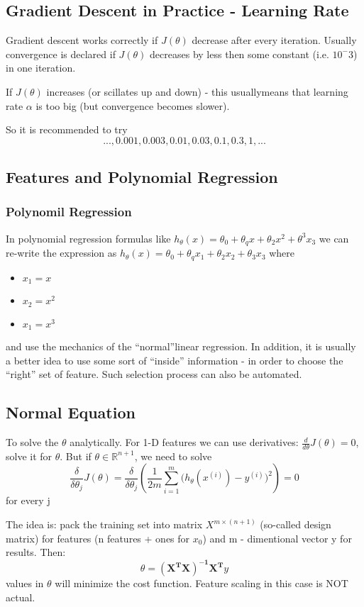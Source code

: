 \documentclass{scrartcl}
\begin{document}
\subsection {Gradient Descent in Practice - Learning Rate}
\label {4-4}
Gradient descent works correctly if $J(\theta)$ decrease after every
iteration. Usually convergence is declared if $J(\theta)$ decreases by
less then some constant (i.e. $10^-{3}$) in one iteration.

If  $J(\theta)$ increases (or scillates up and down) - this usuallymeans that learning rate
$\alpha$ is too big (but convergence becomes slower).

So it is recommended to try \[
..., 0.001,0.003, 0.01, 0.03, 0.1, 0.3, 1, ...
\]
 
\subsection{Features and Polynomial Regression}
\label{4-5}
\subsubsection{Polynomil Regression}
In polynomial regression formulas like $h_\theta(x)=\theta_0 +
\theta_qx + \theta_2x^2 + \theta^3x_3$ we can re-write the expression
as $h_\theta(x) = \theta_0 + \theta_qx_1 + \theta_2x_2 + \theta_3x_3$
where \begin{itemize}
\item{$x_1=x$}
\item{$x_2=x^2$}
\item{$x_1=x^3$}
\end{itemize}
and use the mechanics of the ``normal''linear regression. In addition,
it is usually a better idea to use some sort of ``inside''
information - in order to choose the ``right'' set of feature. Such
selection process can also be automated.

\subsection {Normal Equation}
\label{4-6}
To solve the $\theta$ analytically. For 1-D features we can use
derivatives: $\frac{d}{d\theta}J(\theta) = 0$, solve it for $\theta$.
But if $\theta \in \mathbb{R}^{n+1}$, we need to solve \[
\frac{\delta}{\delta \theta_j}J(\theta) = 
\frac{\delta}{\delta \theta_j} \left( \frac{1}{2m} \sum\limits_{i=1}^m\big(h_\theta(x^{(i)}) - y^{(i)}\big)^2\right) = 0
\] for every j

The idea is: pack the training set into matrix $X^{m \times (n + 1)}$
(so-called design matrix) for features (n features + ones for $x_0$)
and m - dimentional vector y for results. Then:
\[ \theta = \mathbf{\left( X^TX \right)^{-1}X^T}y  \]
values in $\theta$ will minimize the cost function. Feature scaling in
this case is NOT actual.
\end{document}
